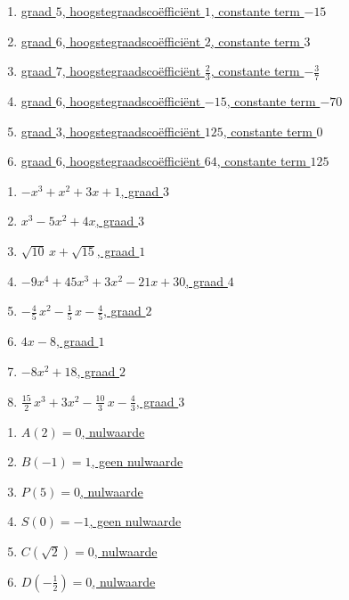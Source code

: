 \documentclass{ximera}
\begin{document}

\begin{Antwoord} \label{antw1.5}
\begin{enumerate}
\item
\hyperlink{oef1.5}{graad $5$, hoogstegraadsco\"effici\"ent $1$, constante term $-15$}
\item
\hyperlink{oef1.5}{graad $6$, hoogstegraadsco\"effici\"ent $2$, constante term $3$}
\item
\hyperlink{oef1.5}{graad $7$, hoogstegraadsco\"effici\"ent $\frac{2}{3}$, constante term $-\frac{3}{7}$}
\item
\hyperlink{oef1.5}{graad $6$, hoogstegraadsco\"effici\"ent $-15$, constante term $-70$}
\item
\hyperlink{oef1.5}{graad $3$, hoogstegraadsco\"effici\"ent $125$, constante term $0$}
\item
\hyperlink{oef1.5}{graad $6$, hoogstegraadsco\"effici\"ent $64$, constante term $125$}
\end{enumerate}
\setcounter{enumi}{6}
\end{Antwoord}

\begin{Antwoord} \label{antw1.7}
\begin{enumerate}
\item
\hyperlink{oef1.7}{$-x^3+x^2+3x+1$, graad $3$}
\item
\hyperlink{oef1.7}{$x^3-5x^2+4x$, graad $3$}
\item
\hyperlink{oef1.7}{$\sqrt{10}\,x+\sqrt{15}$, graad $1$}
\item
\hyperlink{oef1.7}{$-9x^4+45x^3+3x^2-21x+30$, graad $4$}
\item
\hyperlink{oef1.7}{$-\frac{4}{5}\,x^2-\frac{1}{5}\,x-\frac{4}{5}$, graad $2$}
\item
\hyperlink{oef1.7}{$4x-8$, graad $1$}
\item
\hyperlink{oef1.7}{$-8x^2+18$, graad $2$}
\item
\hyperlink{oef1.7}{$\frac{15}{2}\,x^3 + 3x^2 - \frac{10}{3}\,x-\frac{4}{3}$, graad $3$}
\end{enumerate}
\end{Antwoord}

\begin{Antwoord} \label{antw1.8}
\begin{enumerate}
\item
\hyperlink{oef1.8}{$A(2)=0$, nulwaarde}
\item
\hyperlink{oef1.8}{$B(-1)=1$, geen nulwaarde}
\item
\hyperlink{oef1.8}{$P(5)=0$, nulwaarde}
\item
\hyperlink{oef1.8}{$S(0)=-1$, geen nulwaarde}
\item
\hyperlink{oef1.8}{$C(\sqrt{2})=0$, nulwaarde}
\item
\hyperlink{oef1.8}{$D\left(-\frac{1}{2}\right)=0$, nulwaarde}
\end{enumerate}
\end{Antwoord}
\end{document}
